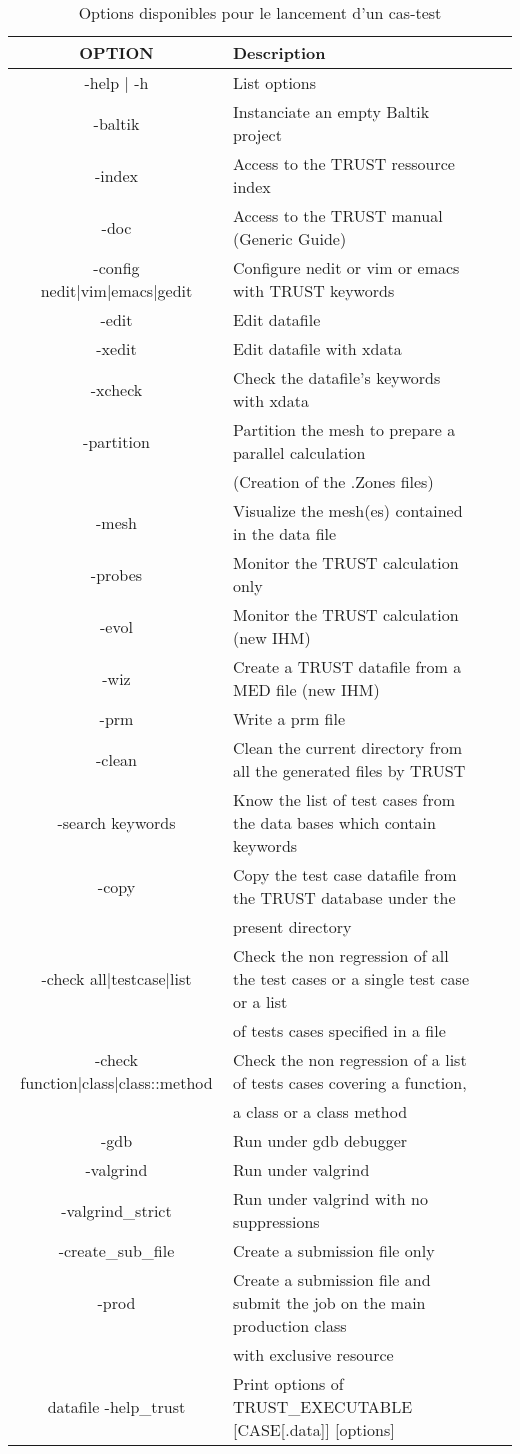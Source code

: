 \begin{table}[H]
\begin{centering}
\small
\begin{tabular}{Sl Sl}
\hline\hline
{}\textbf{OPTION} & \textbf{Description} \tabularnewline
\hline
-help | -h & List options \tabularnewline \hline
-baltik & Instanciate an empty Baltik project \tabularnewline \hline
-index & Access to the TRUST ressource index \tabularnewline \hline
-doc & Access to the TRUST manual (Generic Guide) \tabularnewline \hline
-config nedit|vim|emacs|gedit & Configure nedit or vim or emacs with TRUST keywords \tabularnewline \hline
-edit & Edit datafile \tabularnewline \hline
-xedit & Edit datafile with xdata \tabularnewline \hline
-xcheck & Check the datafile’s keywords with xdata \tabularnewline \hline
-partition & Partition the mesh to prepare a parallel calculation \tabularnewline
&(Creation of the .Zones files) \tabularnewline \hline
-mesh & Visualize the mesh(es) contained in the data file \tabularnewline \hline
-probes & Monitor the TRUST calculation only  \tabularnewline \hline
-evol & Monitor the TRUST calculation (new IHM) \tabularnewline \hline
-wiz & Create a TRUST datafile from a MED file (new IHM) \tabularnewline \hline
-prm & Write a prm file \tabularnewline \hline
-clean & Clean the current directory from all the generated
files by TRUST \tabularnewline \hline
-search keywords & Know the list of test cases from the data bases which contain keywords \tabularnewline \hline
-copy & Copy the test case datafile from the TRUST database
under the \tabularnewline
& present directory \tabularnewline \hline
-check all|testcase|list & Check the non regression of all the test cases or a single test case or a list \tabularnewline
& of tests cases specified in a file \tabularnewline \hline
-check function|class|class::method & Check the non regression of a list of tests cases covering a function, \tabularnewline
& a class or a class method\tabularnewline \hline
-gdb & Run under gdb debugger \tabularnewline \hline
-valgrind & Run under valgrind \tabularnewline \hline
-valgrind\_strict & Run under valgrind with no suppressions \tabularnewline \hline
-create\_sub\_file & Create a submission file only \tabularnewline \hline
-prod & Create a submission file and submit the job on the
main production class \tabularnewline 
& with exclusive resource \tabularnewline \hline
datafile -help\_trust & Print options of TRUST\_EXECUTABLE [CASE[.data]] [options] \tabularnewline \hline
\hline
\end{tabular}
\normalsize
\par\end{centering}
\caption{\label{tab:option-cas}Options disponibles pour le lancement d'un cas-test}
\end{table}
